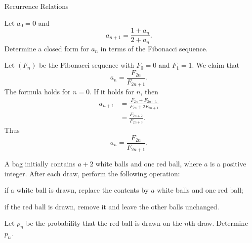 \begin{expectedproblemgroup}{Recurrence Relations}
        \begin{expectedsubproblem}
            Let $a_0=0$ and
            \[
                a_{n+1}=\frac{1+a_n}{2+a_n}.
            \]
            Determine a closed form for $a_n$ in terms of the Fibonacci
            sequence.
        \end{expectedsubproblem}

        \begin{expectedsubsolution}
            Let $(F_n)$ be the Fibonacci sequence with $F_0=0$ and $F_1=1$. We
            claim that
            \[
                a_n=\frac{F_{2n}}{F_{2n+1}}.
            \]
            The formula holds for $n=0$. If it holds for $n$, then
            \[
                \begin{aligned}
                    a_{n+1}
                    &=
                    \frac{F_{2n}+F_{2n+1}}
                    {F_{2n}+2F_{2n+1}}\\
                    &=
                    \frac{F_{2n+2}}{F_{2n+3}}.
                \end{aligned}
            \]
            Thus
            \[
                \boxed{a_n=\frac{F_{2n}}{F_{2n+1}}}.
            \]
        \end{expectedsubsolution}

        \begin{expectedsubproblem}
            A bag initially contains $a+2$ white balls and one red ball, where
            $a$ is a positive integer. After each draw, perform the following
            operation:
            \begin{problemchoices}
                \item if a white ball is drawn, replace the contents by $a$
                white balls and one red ball;
                \item if the red ball is drawn, remove it and leave the other
                balls unchanged.
            \end{problemchoices}
            Let $p_n$ be the probability that the red ball is drawn on the
            $n$th draw. Determine $p_n$.
        \end{expectedsubproblem}


\end{expectedproblemgroup}
